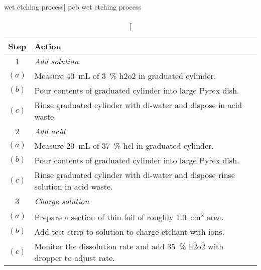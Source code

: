 \documentclass[../main.tex]{subfiles}%
\begin{document}
%
    \Xtable%
    \begin{table}[p]%
        \caption%
            [ wet etching process]%
            {\Gls{pcb} wet etching process}%
        \label{tbl:pcb-etch-process}%
        \begin{tabu}{ c p{5.00in} }%
            \toprule%
            \centering\textbf{Step} &%
            \centering\textbf{Action}\\%
            \toprule%
            1 & \textit{Add solution}\\%
            $(a)$ & Measure \SI{40}{\milli\liter} of \SI{3}{\percent} \gls{h2o2} in graduated cylinder.\\%
            $(b)$ & Pour contents of graduated cylinder into large Pyrex dish.\\%
            $(c)$ & Rinse graduated cylinder with \gls{di-water} and dispose in acid waste.\\%
            \midrule%
            2 & \textit{Add acid}\\%
            $(a)$ & Measure \SI{20}{\milli\liter} of \SI{37}{\percent} \gls{hcl} in graduated cylinder.\\%
            $(b)$ & Pour contents of graduated cylinder into large Pyrex dish.\\%
            $(c)$ & Rinse graduated cylinder with \gls{di-water} and dispose rinse solution in acid waste.\\%
            \midrule%
            3 & \textit{Charge solution}\\%
            $(a)$ & Prepare a section of thin  foil of roughly \SI{1.0}{\centi\meter\squared} area.\\%
            $(b)$ & Add  test strip to solution to charge etchant with  ions.\\%
            $(c)$ & Monitor the dissolution rate and add \SI{35}{\percent} \gls{h2o2} with dropper to adjust rate.\\%

\end{tabu}
\end{table}
\end{document}
